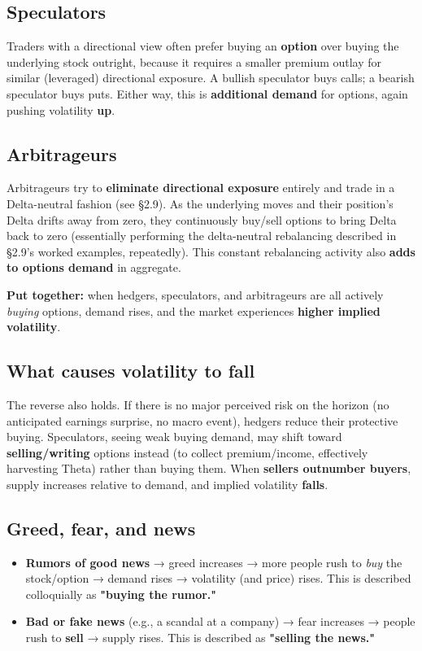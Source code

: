 \documentclass[12pt,openany]{book}
\theoremstyle{definition}
\theoremstyle{remark}
\begin{document}
\subsection{Speculators}

Traders with a directional view often prefer buying an \textbf{option} over buying the underlying stock outright, because it requires a smaller premium outlay for similar (leveraged) directional exposure. A bullish speculator buys calls; a bearish speculator buys puts. Either way, this is \textbf{additional demand} for options, again pushing volatility \textbf{up}.

\subsection{Arbitrageurs}

Arbitrageurs try to \textbf{eliminate directional exposure} entirely and trade in a Delta-neutral fashion (see \S{}2.9). As the underlying moves and their position's Delta drifts away from zero, they continuously buy/sell options to bring Delta back to zero (essentially performing the delta-neutral rebalancing described in \S{}2.9's worked examples, repeatedly). This constant rebalancing activity also \textbf{adds to options demand} in aggregate.

\textbf{Put together:} when hedgers, speculators, and arbitrageurs are all actively \emph{buying} options, demand rises, and the market experiences \textbf{higher implied volatility}.

\subsection{What causes volatility to fall}

The reverse also holds. If there is no major perceived risk on the horizon (no anticipated earnings surprise, no macro event), hedgers reduce their protective buying. Speculators, seeing weak buying demand, may shift toward \textbf{selling/writing} options instead (to collect premium/income, effectively harvesting Theta) rather than buying them. When \textbf{sellers outnumber buyers}, supply increases relative to demand, and implied volatility \textbf{falls}.

\subsection{Greed, fear, and news}

\begin{itemize}
\item \textbf{Rumors of good news} → greed increases → more people rush to \emph{buy} the stock/option → demand rises → volatility (and price) rises. This is described colloquially as \textbf{"buying the rumor."}
\item \textbf{Bad or fake news} (e.g., a scandal at a company) → fear increases → people rush to \textbf{sell} → supply rises. This is described as \textbf{"selling the news."}
\end{itemize}
\end{document}

